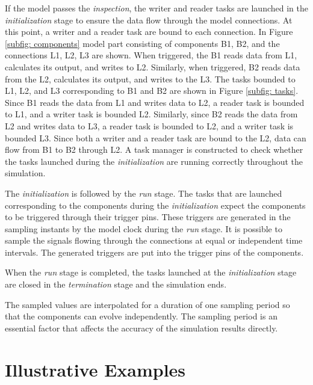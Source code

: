 \documentclass{juliacon}
\begin{document}
If the model passes the \textit{inspection}, the writer and reader tasks are launched in the \textit{initialization} stage to ensure the data flow through the model connections. At this point, a writer and a reader task are bound to each connection. In Figure \ref{subfig: components} model part consisting of components B1, B2, and the connections L1, L2, L3 are shown. When triggered, the B1 reads data from L1, calculates its output, and writes to L2. Similarly, when triggered, B2 reads data from the L2, calculates its output, and writes to the L3. The tasks bounded to L1, L2, and L3 corresponding to B1 and B2 are shown in Figure \ref{subfig: tasks}. Since B1 reads the data from L1 and writes data to L2, a reader task is bounded to L1, and a writer task is bounded L2. Similarly, since B2 reads the data from L2 and writes data to L3, a reader task is bounded to L2, and a writer task is bounded L3. Since both a writer and a reader task are bound to the L2, data can flow from B1 to B2 through L2. A task manager is constructed to check whether the tasks launched during the \textit{initialization} are running correctly throughout the simulation.

The \textit{initialization} is followed by the \textit{run} stage. The tasks that are launched corresponding to the components during the \textit{initialization} expect the components to be triggered through their trigger pins. These triggers are generated in the sampling instants by the model clock during the \textit{run} stage. It is possible to sample the signals flowing through the connections at equal or independent time intervals. The generated triggers are put into the trigger pins of the components.

When the \textit{run} stage is completed, the tasks launched at the \textit{initialization} stage are closed in the \textit{termination} stage and the simulation ends.

The sampled values are interpolated for a duration of one sampling period so that the components can evolve independently. The sampling period is an essential factor that affects the accuracy of the simulation results directly.

\section{Illustrative Examples}
\end{document}

